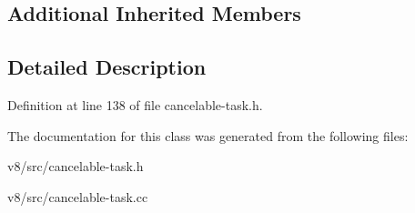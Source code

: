 \subsection*{Additional Inherited Members}


\subsection{Detailed Description}


Definition at line 138 of file cancelable-\/task.\+h.



The documentation for this class was generated from the following files\+:\begin{DoxyCompactItemize}
\item 
v8/src/cancelable-\/task.\+h\item 
v8/src/cancelable-\/task.\+cc\end{DoxyCompactItemize}

